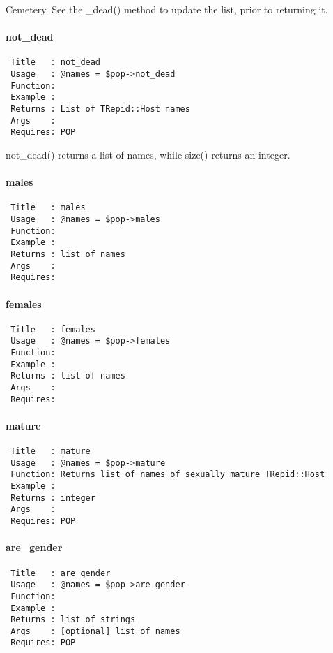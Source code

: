 Cemetery. See the \_dead() method to update the list, prior to returning it.

\paragraph*{not\_dead\label{not_dead}}
\begin{verbatim}
 Title   : not_dead
 Usage   : @names = $pop->not_dead
 Function: 
 Example : 
 Returns : List of TRepid::Host names
 Args    : 
 Requires: POP
\end{verbatim}


not\_dead() returns a list of names, while size() returns an integer.

\paragraph*{males\label{males}}
\begin{verbatim}
 Title   : males
 Usage   : @names = $pop->males
 Function: 
 Example : 
 Returns : list of names
 Args    : 
 Requires:
\end{verbatim}
\paragraph*{females\label{females}}
\begin{verbatim}
 Title   : females
 Usage   : @names = $pop->females
 Function: 
 Example : 
 Returns : list of names
 Args    : 
 Requires:
\end{verbatim}
\paragraph*{mature\label{mature}}
\begin{verbatim}
 Title   : mature
 Usage   : @names = $pop->mature
 Function: Returns list of names of sexually mature TRepid::Host
 Example :
 Returns : integer
 Args    :
 Requires: POP
\end{verbatim}
\paragraph*{are\_gender\label{are_gender}}
\begin{verbatim}
 Title   : are_gender
 Usage   : @names = $pop->are_gender
 Function: 
 Example : 
 Returns : list of strings
 Args    : [optional] list of names
 Requires: POP
\end{verbatim}
